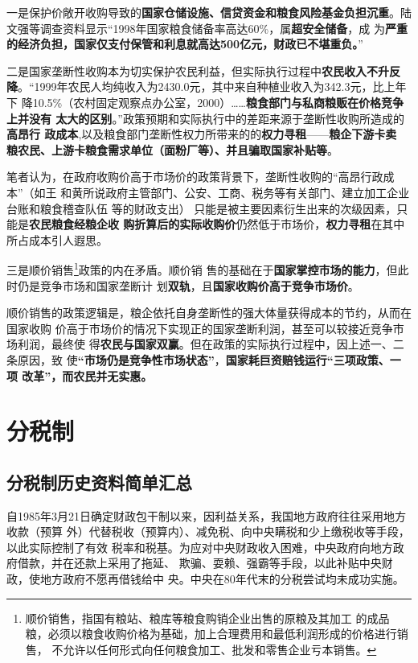 一是保护价敞开收购导致的\textbf{国家仓储设施、信贷资金和粮食风险基金负担沉重}。陆
文强等调查资料显示“1998年国家粮食储备率高达60\%，属\textbf{超安全储备}，成
为\textbf{严重的经济负担，国家仅支付保管和利息就高达500亿元，财政已不堪重负。}”

二是国家垄断性收购本为切实保护农民利益，但实际执行过程中\textbf{农民收入不升反
  降}。“1999年农民人均纯收入为2430.0元，其中来自种植业收入为342.3元，比上年下
降10.5\%（农村固定观察点办公室，2000）……\textbf{粮食部门与私商粮贩在价格竞争上并没有
  太大的区别}。”政策预期和实际执行中的差距来源于垄断性收购所造成的\textbf{高昂行
  政成本},以及粮食部门垄断性权力所带来的的\textbf{权力寻租}——\textbf{粮企下游卡卖
  粮农民、上游卡粮食需求单位（面粉厂等）、并且骗取国家补贴等}。

笔者认为，在政府收购价高于市场价的政策背景下，垄断性收购的“高昂行政成本”（如王
和黄所说政府主管部门、公安、工商、税务等有关部门、建立加工企业台账和粮食稽查队伍
等的财政支出） 只能是被主要因素衍生出来的次级因素，只能是\textbf{农民粮食经粮企收
  购折算后的实际收购价}仍然低于市场价，\textbf{权力寻租}在其中所占成本引人遐思。

三是顺价销售\footnote{顺价销售，指国有粮站、粮库等粮食购销企业出售的原粮及其加工
  的成品粮，必须以粮食收购价格为基础，加上合理费用和最低利润形成的价格进行销售，
  不允许以任何形式向任何粮食加工、批发和零售企业亏本销售。}政策的内在矛盾。顺价销
售的基础在于\textbf{国家掌控市场的能力}，但此时仍是竞争市场和国家垄断计
划\textbf{双轨}，且\textbf{国家收购价高于竞争市场价}。

顺价销售的政策逻辑是，粮企依托自身垄断性的强大体量获得成本的节约，从而在国家收购
价高于市场价的情况下实现正的国家垄断利润，甚至可以较接近竞争市场利润，最终使
得\textbf{农民与国家双赢}。但在政策的实际执行过程中，因上述一、二条原因，致
使\textbf{“市场仍是竞争性市场状态”}，\textbf{国家耗巨资赔钱运行“三项政策、一项
  改革”，而农民并无实惠。}


\section{分税制}


\subsection{分税制历史资料简单汇总}

自1985年3月21日确定财政包干制以来，因利益关系，我国地方政府往往采用地方收款（预算
外）代替税收（预算内）、减免税、向中央瞒税和少上缴税收等手段，以此实际控制了有效
税率和税基。为应对中央财政收入困难，中央政府向地方政府借款，并在还款上采用了拖延、
欺骗、耍赖、强霸等手段，以此补贴中央财政，使地方政府不愿再借钱给中
央。\cite{majuncaigai}中央在80年代末的分税尝试均未成功实施。

